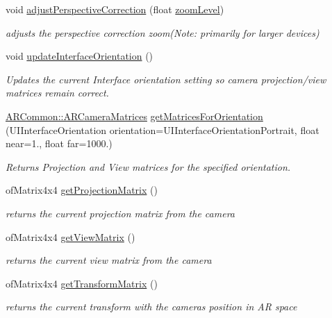 \begin{DoxyCompactItemize}
\item 
void \hyperlink{class_a_r_core_1_1_a_r_cam_ae2ecd3007e6684d1686c89d2ac3e7020}{adjust\+Perspective\+Correction} (float \hyperlink{class_a_r_core_1_1_a_r_cam_ac17d3b7fd12f51b2c54b7241efd36cd4}{zoom\+Level})
\begin{DoxyCompactList}\small\item\em adjusts the perspective correction zoom(\+Note\+: primarily for larger devices) \end{DoxyCompactList}\item 
void \hyperlink{class_a_r_core_1_1_a_r_cam_ac649b1e884931f123afd4dcecc1e3e6c}{update\+Interface\+Orientation} ()
\begin{DoxyCompactList}\small\item\em Updates the current Interface orientation setting so camera projection/view matrices remain correct. \end{DoxyCompactList}\item 
\hyperlink{struct_a_r_common_1_1_a_r_camera_matrices}{A\+R\+Common\+::\+A\+R\+Camera\+Matrices} \hyperlink{class_a_r_core_1_1_a_r_cam_a0061e3c56e3d30e6fec64235d9397809}{get\+Matrices\+For\+Orientation} (U\+I\+Interface\+Orientation orientation=U\+I\+Interface\+Orientation\+Portrait, float near=1., float far=1000.)
\begin{DoxyCompactList}\small\item\em Returns Projection and View matrices for the specified orientation. \end{DoxyCompactList}\item 
of\+Matrix4x4 \hyperlink{class_a_r_core_1_1_a_r_cam_a19409c89b0bcbaad62e5d405d194f8a7}{get\+Projection\+Matrix} ()
\begin{DoxyCompactList}\small\item\em returns the current projection matrix from the camera \end{DoxyCompactList}\item 
of\+Matrix4x4 \hyperlink{class_a_r_core_1_1_a_r_cam_a7ca28300844875464c7821620665d3b5}{get\+View\+Matrix} ()
\begin{DoxyCompactList}\small\item\em returns the current view matrix from the camera \end{DoxyCompactList}\item 
of\+Matrix4x4 \hyperlink{class_a_r_core_1_1_a_r_cam_a280c37d6b4aa16169637cf3f5332c9d3}{get\+Transform\+Matrix} ()
\begin{DoxyCompactList}\small\item\em returns the current transform with the camera\textquotesingle{}s position in AR space \end{DoxyCompactList}\item 

\end{DoxyCompactItemize}
